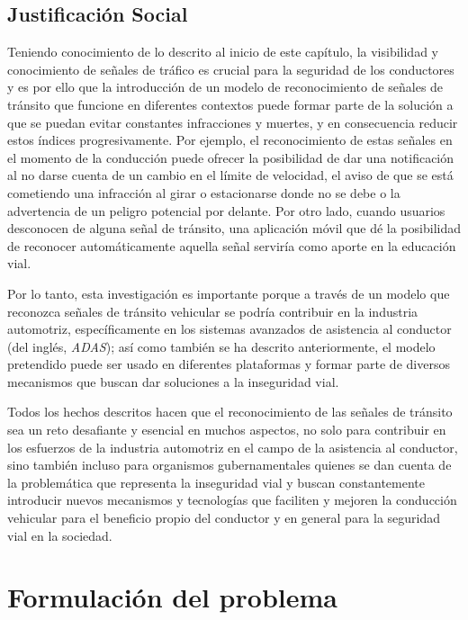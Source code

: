 	\subsection{Justificación Social}
	
	Teniendo conocimiento de lo descrito al inicio de este capítulo, la visibilidad y conocimiento de señales de tráfico es crucial para la seguridad de los conductores y es por ello que la introducción de un modelo de reconocimiento de señales de tránsito que funcione en diferentes contextos puede formar parte de la solución a que se puedan evitar constantes infracciones y muertes, y en consecuencia reducir estos índices progresivamente. Por ejemplo, el reconocimiento de estas señales en el momento de la conducción puede ofrecer la posibilidad de dar una notificación al no darse cuenta de un cambio en el límite de velocidad, el aviso de que se está cometiendo una infracción al girar o estacionarse donde no se debe o la advertencia de un peligro potencial por delante. Por otro lado, cuando usuarios desconocen de alguna señal de tránsito, una aplicación móvil que dé la posibilidad de reconocer automáticamente aquella señal serviría como aporte en la educación vial.\vskip 0.2cm

	Por lo tanto, esta investigación es importante porque a través de un modelo que reconozca señales de tránsito vehicular se podría contribuir en la industria automotriz, específicamente en los sistemas avanzados de asistencia al conductor (del inglés, \textit{ADAS}); así como también se ha descrito anteriormente, el modelo pretendido puede ser usado en diferentes plataformas y formar parte de diversos mecanismos que buscan dar soluciones a la inseguridad vial. \vskip 0.2cm
	
	Todos los hechos descritos hacen que el reconocimiento de las señales de tránsito sea un reto desafiante y esencial en muchos aspectos, no solo para contribuir en los esfuerzos de la industria automotriz en el campo de la asistencia al conductor, sino también incluso para organismos gubernamentales quienes se dan cuenta de la problemática que representa la inseguridad vial y buscan constantemente introducir nuevos mecanismos y tecnologías que faciliten y mejoren la conducción vehicular para el beneficio propio del conductor y en general para la seguridad vial en la sociedad.


\section{Formulación del problema}

